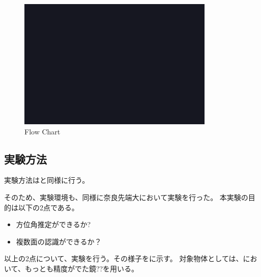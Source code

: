 \begin{figure}[tb]
  \begin{center}
  \vspace{1zh}
    \includegraphics[width=0.7\linewidth]{images/fig_sample.png}   
  \end{center}
  \caption{Flow Chart}
  \label{fig:hand_soft_flow}
\end{figure}

\clearpage

\subsection{実験方法}
\label{sec:hand_exp_env}
実験方法はと同様に行う。

そのため、実験環境も、同様に奈良先端大において実験を行った。
本実験の目的は以下の2点である。

\begin{itemize}
    \item 方位角推定ができるか?
    \item 複数面の認識ができるか？
\end{itemize}

以上の2点について、実験を行う。その様子をに示す。
対象物体としては、において、もっとも精度がでた鏡??を用いる。


